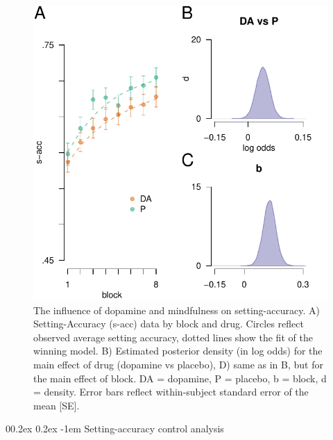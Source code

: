 \documentclass[
  man]{apa6}
\makeatletter
\let\oldparagraph\paragraph
\renewcommand{\paragraph}[1]{\oldparagraph{#1}\mbox{}}
\renewcommand{\paragraph}{\@startsection{paragraph}{4}{\parindent}%
  {0\baselineskip \@plus 0.2ex \@minus 0.2ex}%
  {-1em}%
  {\normalfont\normalsize\bfseries\itshape\typesectitle}}
\makeatother
\begin{document}
\begin{figure}

{\centering \includegraphics[width=0.7\linewidth]{../../images/cacc_fig} 

}

\caption{The influence of dopamine and mindfulness on setting-accuracy. A) Setting-Accuracy (s-acc) data by block and drug. Circles reflect observed average setting accuracy, dotted lines show the fit of the winning model. B) Estimated posterior density (in log odds) for the main effect of drug (dopamine vs placebo), D) same as in B, but for the main effect of block. DA = dopamine, P = placebo, b = block, d = density. Error bars reflect within-subject standard error of the mean [SE].}\label{fig:caccfig}
\end{figure}

\hypertarget{setting-accuracy-control-analysis}{%
\paragraph{Setting-accuracy control analysis}\label{setting-accuracy-control-analysis}}
\end{document}

